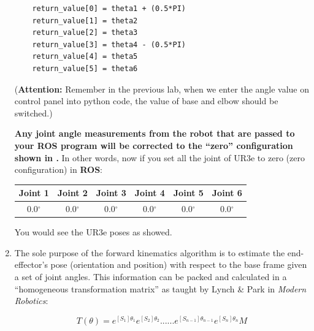 \begin{enumerate}
\begin{lstlisting}
	return_value[0] = theta1 + (0.5*PI)
	return_value[1] = theta2
	return_value[2] = theta3
	return_value[3] = theta4 - (0.5*PI)
	return_value[4] = theta5
	return_value[5] = theta6
\end{lstlisting}

(\textbf{Attention:} Remember in the previous lab, when we enter the angle value
on control panel into python code, the value of base and elbow should be
switched.)

\textbf{Any joint angle measurements from the robot that are passed to your ROS program will be corrected to the “zero” configuration shown in .}
In other words, now if you set all the joint of UR3e to zero (zero configuration) in \textbf{ROS}:
\begin{center}
\begin{tabular}{ |c|c|c|c|c|c| } 
\hline
Joint 1 & Joint 2 & Joint 3 & Joint 4 & Joint 5 & Joint 6\\
\hline
0.0$^{\circ}$ & 0.0$^{\circ}$ & 0.0$^{\circ}$ & 0.0$^{\circ}$ & 0.0$^{\circ}$ & 0.0$^{\circ}$\\ 
\hline
\end{tabular}
\end{center}
You would see the UR3e poses as  showed.

\item The sole purpose of the forward kinematics algorithm is to estimate the end-effector's pose (orientation and position) with respect to the base frame given a set of joint angles. This information can be packed and calculated in a “homogeneous transformation matrix” as taught by Lynch \& Park in \textit{Modern Robotics}:
\begin{center}
\begin{equation*}
T(\theta) = e^{[S_1]\theta_1} e^{[S_2]\theta_2}...... e^{[S_{n-1}]\theta_{n-1}} e^{[S_n]\theta_n} M
\end{equation*}
\end{center}


\end{enumerate}
